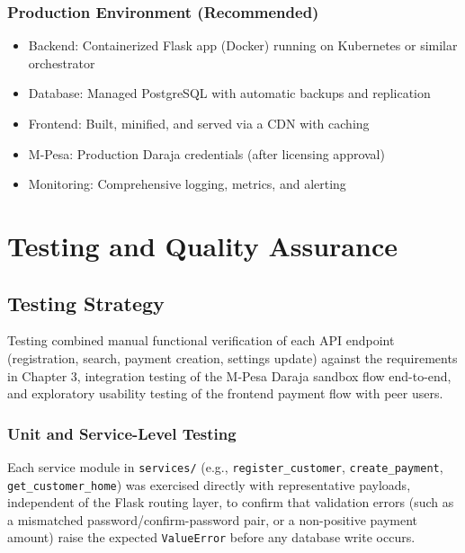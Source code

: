 \documentclass[12pt, a4paper, twoside, openright]{report}
\begin{document}
\subsection{Production Environment (Recommended)}

\begin{itemize}
    \item Backend: Containerized Flask app (Docker) running on Kubernetes or similar orchestrator
    \item Database: Managed PostgreSQL with automatic backups and replication
    \item Frontend: Built, minified, and served via a CDN with caching
    \item M-Pesa: Production Daraja credentials (after licensing approval)
    \item Monitoring: Comprehensive logging, metrics, and alerting
\end{itemize}


\chapter{Testing and Quality Assurance}

\section{Testing Strategy}

Testing combined manual functional verification of each API endpoint (registration, search, payment creation, settings update) against the requirements in Chapter 3, integration testing of the M-Pesa Daraja sandbox flow end-to-end, and exploratory usability testing of the frontend payment flow with peer users.

\subsection{Unit and Service-Level Testing}

Each service module in \texttt{services/} (e.g., \texttt{register\_customer}, \texttt{create\_payment}, \texttt{get\_customer\_home}) was exercised directly with representative payloads, independent of the Flask routing layer, to confirm that validation errors (such as a mismatched password/confirm-password pair, or a non-positive payment amount) raise the expected \texttt{ValueError} before any database write occurs.
\end{document}
